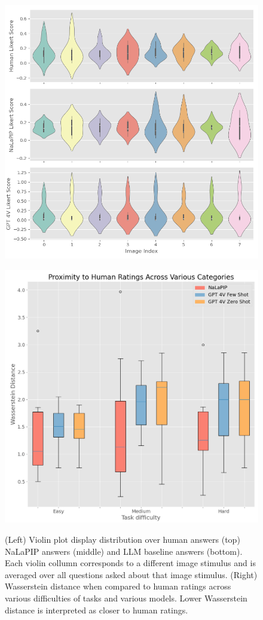 \documentclass[10pt,letterpaper]{article}
\begin{document}
\begin{figure}[ht]
\hfill
    \parbox{.47\linewidth}{
        \centering
        \includegraphics[scale=0.4]{images/stacked_violin_plot.png}
        \label{fig:violin}
    }
    \hfill
    \parbox{.47\linewidth}{
        \centering
        \includegraphics[scale=0.33]{images/wasserstein_distance_by_runtime.png}
        \label{fig:wasserstein_distance_by_runtime}
    }
    \caption{(Left) Violin plot display distribution over human answers (top) NaLaPIP answers (middle) and LLM baseline answers (bottom). Each violin collumn corresponds to a different image stimulus and is averaged over all questions asked about that image stimulus. (Right) Wasserstein distance when compared to human ratings across various difficulties of tasks and various models. Lower Wasserstein distance is interpreted as closer to human ratings.}
\end{figure}
\end{document}
